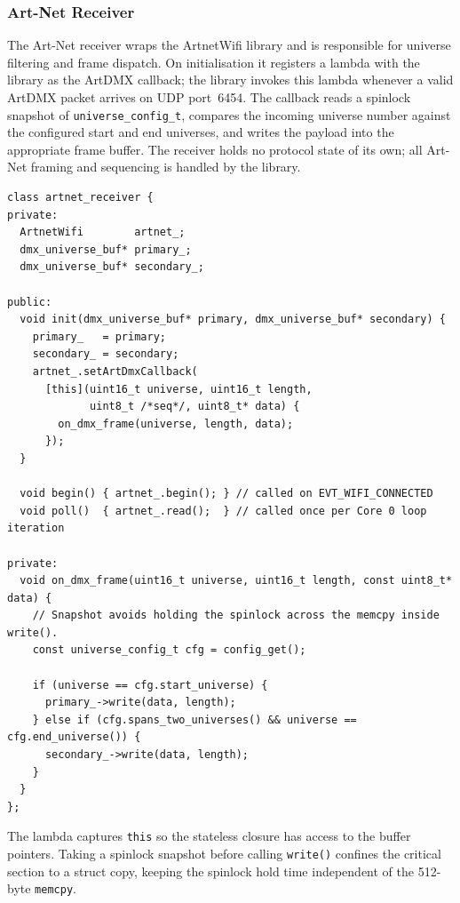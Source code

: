 \subsubsection{Art-Net Receiver}
\label{sec:artnet_receiver}

The Art-Net receiver wraps the ArtnetWifi library and is responsible for universe filtering and frame dispatch.
On initialisation it registers a lambda with the library as the ArtDMX callback; the library invokes this lambda whenever a valid ArtDMX packet arrives on \ac{UDP} port~6454.
The callback reads a spinlock snapshot of \texttt{universe\_config\_t}, compares the incoming universe number against the configured start and end universes, and writes the payload into the appropriate frame buffer.
The receiver holds no protocol state of its own; all Art-Net framing and sequencing is handled by the library.

\begin{longlisting}
\begin{verbatim}
class artnet_receiver {
private:
  ArtnetWifi        artnet_;
  dmx_universe_buf* primary_;
  dmx_universe_buf* secondary_;

public:
  void init(dmx_universe_buf* primary, dmx_universe_buf* secondary) {
    primary_   = primary;
    secondary_ = secondary;
    artnet_.setArtDmxCallback(
      [this](uint16_t universe, uint16_t length,
             uint8_t /*seq*/, uint8_t* data) {
        on_dmx_frame(universe, length, data);
      });
  }

  void begin() { artnet_.begin(); } // called on EVT_WIFI_CONNECTED
  void poll()  { artnet_.read();  } // called once per Core 0 loop iteration

private:
  void on_dmx_frame(uint16_t universe, uint16_t length, const uint8_t* data) {
    // Snapshot avoids holding the spinlock across the memcpy inside write().
    const universe_config_t cfg = config_get();

    if (universe == cfg.start_universe) {
      primary_->write(data, length);
    } else if (cfg.spans_two_universes() && universe == cfg.end_universe()) {
      secondary_->write(data, length);
    }
  }
};
\end{verbatim}
\caption{Art-Net receiver implementation.}
\label{lst:artnet_receiver}
\end{longlisting}

The lambda captures \texttt{this} so the stateless closure has access to the buffer pointers.
Taking a spinlock snapshot before calling \texttt{write()} confines the critical section to a struct copy, keeping the spinlock hold time independent of the \num{512}-byte \texttt{memcpy}.

